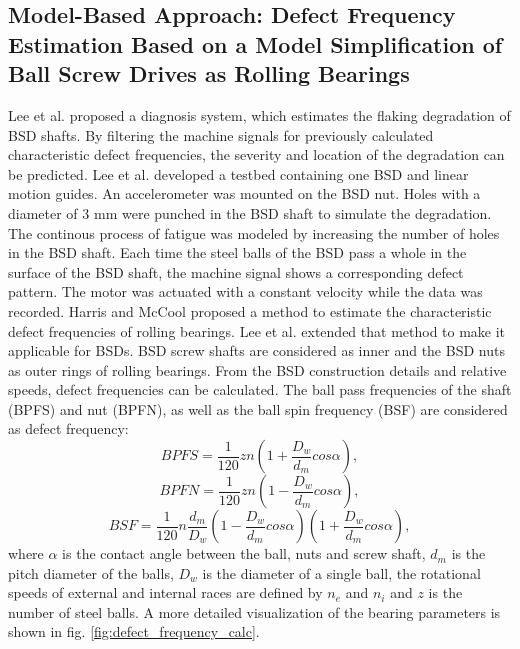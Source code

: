 \subsection{Model-Based Approach: Defect Frequency Estimation Based on a Model Simplification of Ball Screw Drives as Rolling Bearings}
Lee et al. \cite{Lee2015} proposed a diagnosis system, which estimates the flaking degradation of BSD shafts. By filtering the machine signals for previously calculated characteristic defect frequencies, the severity and location of the degradation can be predicted. Lee et al. developed a testbed containing one BSD and linear motion guides. An accelerometer was mounted on the BSD nut. Holes with a diameter of 3 mm were punched in the BSD shaft to simulate the degradation. The continous process of fatigue was modeled by increasing the number of holes in the BSD shaft. Each time the steel balls of the BSD pass a whole in the surface of the BSD shaft, the machine signal shows a corresponding defect pattern. The motor was actuated with a constant velocity while the data was recorded. Harris and McCool \cite{Harris1996} proposed a method to estimate the characteristic defect frequencies of rolling bearings. Lee et al. \cite{Lee2015} extended that method to make it applicable for BSDs. BSD screw shafts are considered as inner and the BSD nuts as outer rings of rolling bearings. From the BSD construction details and relative speeds, defect frequencies can be calculated. The ball pass frequencies of the shaft (BPFS) and nut (BPFN), as well as the ball spin frequency (BSF) are considered as defect frequency: 
\begin{equation}
    BPFS = \frac{1}{120}zn(1+\frac{D_{w}}{d_{m}}cos\alpha),
    \label{eq:defect_frequency}
\end{equation}
\begin{equation}
    BPFN = \frac{1}{120}zn(1-\frac{D_{w}}{d_{m}}cos\alpha),
\end{equation}
\begin{equation}
    BSF = \frac{1}{120}n\frac{d_{m}}{D_{w}} (1-\frac{D_{w}}{d_{m}}cos\alpha)(1+\frac{D_{w}}{d_{m}}cos\alpha) ,
\end{equation}
where $\alpha$ is the contact angle between the ball, nuts and screw shaft, $d_{m}$ is the pitch diameter of the balls, $D_{w}$ is the diameter of a single ball, the rotational speeds of external and internal races are defined by $n_{e}$ and $n_{i}$ and $z$ is the number of steel balls. A more detailed visualization of the bearing parameters is shown in fig. \ref{fig:defect_frequency_calc}. 

